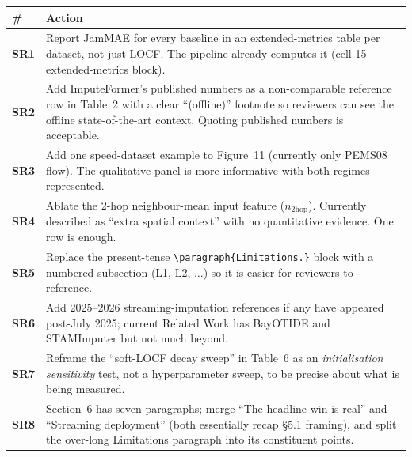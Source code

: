 \documentclass[11pt]{article}
\begin{document}
\begin{tabularx}{\linewidth}{@{}lX@{}}
\toprule
\textbf{\#} & \textbf{Action} \\
\midrule
\textbf{SR1} & Report JamMAE for every baseline in an extended-metrics
               table per dataset, not just LOCF.  The pipeline already
               computes it (cell 15 extended-metrics block). \\[3pt]
\textbf{SR2} & Add ImputeFormer's published numbers as a
               non-comparable reference row in Table~2 with a clear
               ``(offline)'' footnote so reviewers can see the offline
               state-of-the-art context.  Quoting published numbers is
               acceptable. \\[3pt]
\textbf{SR3} & Add one speed-dataset example to Figure~11 (currently
               only PEMS08 flow).  The qualitative panel is more
               informative with both regimes represented. \\[3pt]
\textbf{SR4} & Ablate the 2-hop neighbour-mean input feature
               ($n_{\text{2hop}}$).  Currently described as ``extra
               spatial context'' with no quantitative evidence.  One
               row is enough. \\[3pt]
\textbf{SR5} & Replace the present-tense
               \verb|\paragraph{Limitations.}| block with a numbered
               subsection (L1, L2, $\ldots$) so it is easier for
               reviewers to reference. \\[3pt]
\textbf{SR6} & Add 2025--2026 streaming-imputation references if any
               have appeared post-July 2025; current Related Work has
               BayOTIDE and STAMImputer but not much beyond. \\[3pt]
\textbf{SR7} & Reframe the ``soft-LOCF decay sweep'' in Table~6 as an
               \emph{initialisation sensitivity} test, not a
               hyperparameter sweep, to be precise about what is being
               measured. \\[3pt]
\textbf{SR8} & Section~6 has seven paragraphs; merge ``The headline win
               is real'' and ``Streaming deployment'' (both essentially
               recap \S5.1 framing), and split the over-long
               Limitations paragraph into its constituent points. \\
\bottomrule
\end{tabularx}
\end{document}

